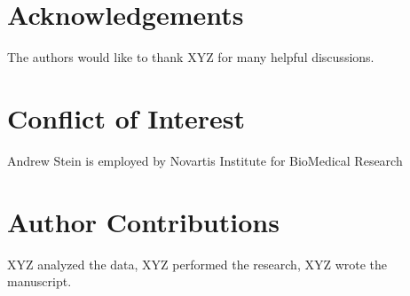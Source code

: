 \documentclass{article}
\begin{document}
\section*{Acknowledgements}
The authors would like to thank XYZ for many helpful discussions.

\section*{Conflict of Interest}
Andrew Stein is employed by Novartis Institute for BioMedical Research

\section*{Author Contributions}
XYZ analyzed the data, XYZ performed the research, XYZ wrote the manuscript.

 

\end{document}
